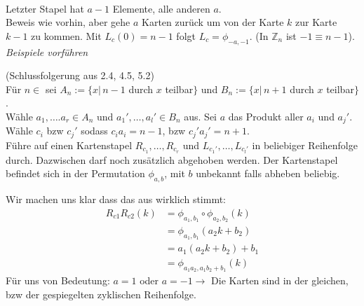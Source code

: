 \documentclass[a4paper]{article}
\begin{document}
\begin{beweis}
\begin{itemize}
\begin{figure}[htbp]
\end{figure} \\
Letzter Stapel hat $a-1$ Elemente, alle anderen $a$. \\
Beweis wie vorhin, aber gehe $a$ Karten zurück um von der Karte $k$ zur Karte $k-1$ zu kommen. Mit $L_c(0) = n-1$ folgt $L_c = \phi_{-a,-1}$. (In $\mathbb{Z}_n$ ist $-1\equiv n-1$). \\
    \textit{Beispiele vorführen}
    \end{itemize}
    \end {beweis}
    \begin{lemma}
   (Schlussfolgerung aus 2.4, 4.5, 5.2) \\
    Für $n \in $  sei $A_n := \lbrace x \big\vert \, n-1$ durch $x$ teilbar$\rbrace$ und $B_n := \lbrace x \big\vert \, n+1$ durch $x$ teilbar$\rbrace$. \\
    Wähle $a_1, …. a_r \in A_n$ und $a_1', …, a_l' \in B_n$ aus. Sei $a$ das Produkt aller $a_i$ und $a_j'$. Wähle $c_i$ bzw $c_j'$ sodass $c_ia_i = n-1$, bzw $c_j'a_j' = n+1$. \\
    Führe auf einen Kartenstapel $R_{c_1}, …, R_{c_r}$ und $L_{c_1'}, …, L_{c_l'}$ in beliebiger Reihenfolge durch. Dazwischen darf noch zusätzlich abgehoben werden. Der Kartenstapel befindet sich in der Permutation $\phi_{a,b}$, mit $b$ unbekannt falls abheben beliebig. 
    \end{lemma}
    Wir machen uns klar dass das aus wirklich stimmt: \\
    \begin{align*}
        	R_{c1}R_{c2}(k) &= \phi_{a_1, b_1}  \circ \phi_{a_2, b_2}(k) \\
        	& = \phi_{a_1, b_1}(a_2k + b_2) \\
        	& = a_1(a_2k + b_2) + b_1 \\
        	& = \phi_{a_1a_2, a_1b_2+b_1}(k)
    \end{align*}
    Für uns von Bedeutung: $a=1$ oder $a=-1 \rightarrow$ Die Karten sind in der gleichen, bzw der gespiegelten zyklischen Reihenfolge.
\end{document}
